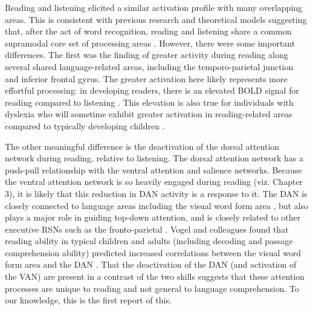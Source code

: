 Reading and listening elicited a similar activation profile with many overlapping areas. This is consistent with previous research and theoretical models suggesting that, after the act of word recognition, reading and listening share a common supramodal core set of processing areas \citep{Rueckl2015, Hoover1990, Price2012}. However, there were some important differences. The first was the finding of greater activity during reading along several shared language-related areas, including the temporo-parietal junction and inferior frontal gyrus. The greater activation here likely represents more effortful processing: in developing readers, there is an elevated BOLD signal for reading compared to listening \citep{Berl2011}. This elevation is also true for individuals with dyslexia who will sometime exhibit greater activation in reading-related areas compared to typically developing children \citep{Pugh2000}. 

The other meaningful difference is the deactivation of the dorsal attention network during reading, relative to listening. The dorsal attention network has a push-pull relationship with the ventral attention and salience networks. Because the ventral attention network is so heavily engaged during reading (viz. Chapter 3), it is likely that this reduction in DAN activity is a response to it. The DAN is closely connected to language areas including the visual word form area \citep{Bouhali2014}, but also plays a major role in guiding top-down attention, and is closely related to other executive RSNs such as the fronto-parietal \citep{Vogel2014}. Vogel and colleagues found that reading ability in typical children and adults (including decoding and passage comprehension ability) predicted increased correlations between the visual word form area and the DAN \citep{Vogel2012a}. That the deactivation of the DAN (and activation of the VAN) are present in a contrast of the two skills suggests that these attention processes are unique to reading and not general to language comprehension. To our knowledge, this is the first report of this.


